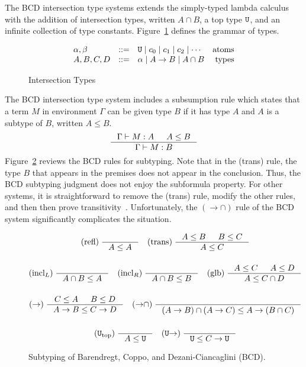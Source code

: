 \documentclass{article}
\begin{document}
The BCD intersection type systems extends the simply-typed lambda
calculus with the addition of intersection types, written $A \cap B$, a
top type $\mathtt{U}$, and an infinite collection of type
constants. Figure~\ref{fig:types} defines the grammar of types.

\begin{figure}[tbp]
  \[
  \begin{array}{lclr}
    \alpha,\beta & ::= & \mathtt{U} \mid c_0 \mid c_1 \mid c_2 \mid \cdots & \text{atoms}\\
    A,B,C,D & ::= & \alpha \mid A \to B \mid A \cap B & \text{types}
  \end{array}
  \]
  \caption{Intersection Types}
  \label{fig:types}
\end{figure}

The BCD intersection type system includes a subsumption rule which
states that a term $M$ in environment $\Gamma$ can be given type $B$
if it has type $A$ and $A$ is a subtype of $B$, written $A \leq B$.
\[
\inference{\Gamma \vdash M : A & A \leq B}
          {\Gamma \vdash M : B}
\]
Figure~\ref{fig:BCD-subtyping} reviews the BCD rules for subtyping.
Note that in the (trans) rule, the type $B$ that appears in the
premises does not appear in the conclusion. Thus, the BCD subtyping
judgment does not enjoy the subformula property.  For other systems,
it is straightforward to remove the (trans) rule, modify the other
rules, and then then prove transitivity~\citep{Muehlboeck:2018aa}.
Unfortunately, the $({\to}{\cap})$ rule of the BCD system significantly
complicates the situation.

\begin{figure}[tbp]
  \begin{gather*}
    \text{(refl)} \; \inference{}{A \leq A} \quad
    \text{(trans)} \; \inference{A \leq B & B \leq C}{A \leq C} \\[3ex]
    \text{(incl$_L$)} \; \inference{}{A \cap B \leq A} \quad
    \text{(incl$_R$)} \; \inference{}{A \cap B \leq B} \quad
    \text{(glb)} \; \inference{A \leq C & A \leq D}{A \leq C \cap D} \\[3ex]
    (\to) \; \inference{C \leq A & B \leq D}{A \to B \leq C \to D} \quad
    ({\to}{\cap}) \; \inference{}{(A \to B) \cap (A \to C) \leq A \to (B \cap C)} \\[3ex]
    (\TOP_{\mathrm{top}}) \; \inference{}{A \leq \TOP} \quad
    (\TOP{\to}) \; \inference{}{\TOP \leq C \to \TOP}
  \end{gather*}
  \caption{Subtyping of Barendregt, Coppo, and
    Dezani-Ciancaglini (BCD).}
  \label{fig:BCD-subtyping}
\end{figure}
\end{document}
